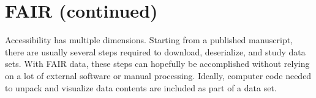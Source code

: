
\section{FAIR (continued)}\fbeg{}\begin{frame}{}

\begin{ftxt}

Accessibility has multiple dimensions.  Starting from a published 
manuscript, there are usually several steps required to download, 
deserialize, and study data sets.  With FAIR data, these steps 
can hopefully be accomplished without relying on 
a lot of external software or manual processing.  
Ideally, computer code needed to unpack and visualize 
data contents are included as part of a data set.

\end{ftxt}

\end{frame}

